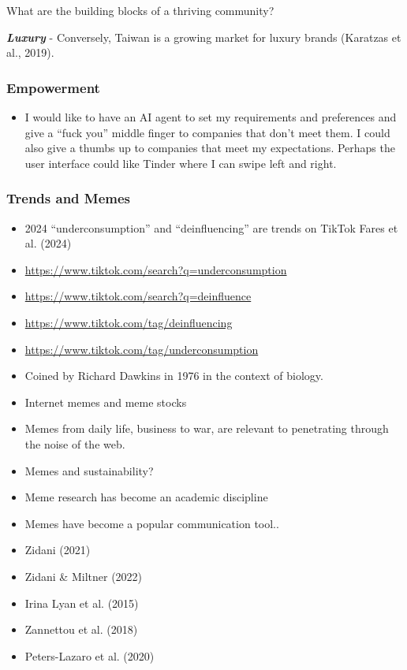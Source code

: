 \documentclass[
  letterpaper,
  DIV=11,
  numbers=noendperiod]{scrartcl}
\providecommand{\tightlist}{%
  \setlength{\itemsep}{0pt}\setlength{\parskip}{0pt}}\usepackage{longtable,booktabs,array}
\begin{document}
What are the building blocks of a thriving community?

\textbf{\emph{Luxury}} - Conversely, Taiwan is a growing market for
luxury brands (Karatzas et al., 2019).

\subsubsection{Empowerment}\label{empowerment}

\begin{itemize}
\tightlist
\item
  I would like to have an AI agent to set my requirements and
  preferences and give a ``fuck you'' middle finger to companies that
  don't meet them. I could also give a thumbs up to companies that meet
  my expectations. Perhaps the user interface could like Tinder where I
  can swipe left and right.
\end{itemize}

\subsubsection{Trends and Memes}\label{trends-and-memes}

\begin{itemize}
\item
  2024 ``underconsumption'' and ``deinfluencing'' are trends on TikTok
  Fares et al. (2024)
\item
  \url{https://www.tiktok.com/search?q=underconsumption}
\item
  \url{https://www.tiktok.com/search?q=deinfluence}
\item
  \url{https://www.tiktok.com/tag/deinfluencing}
\item
  \url{https://www.tiktok.com/tag/underconsumption}
\item
  Coined by Richard Dawkins in 1976 in the context of biology.
\item
  Internet memes and meme stocks
\item
  Memes from daily life, business to war, are relevant to penetrating
  through the noise of the web.
\item
  Memes and sustainability?
\item
  Meme research has become an academic discipline
\item
  Memes have become a popular communication tool..
\item
  Zidani (2021)
\item
  Zidani \& Miltner (2022)
\item
  Irina Lyan et al. (2015)
\item
  Zannettou et al. (2018)
\item
  Peters-Lazaro et al. (2020)
\end{itemize}
\end{document}
